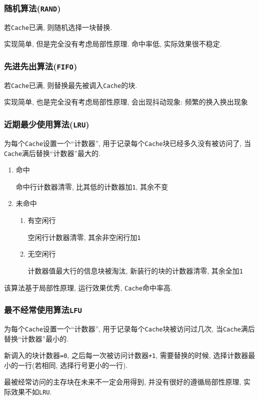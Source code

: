 \subsubsection{随机算法(\texttt{RAND})}
若\verb|Cache|已满, 则随机选择一块替换. \par
实现简单, 但是完全没有考虑局部性原理. 命中率低, 实际效果很不稳定.
\subsubsection{先进先出算法(\texttt{FIFO})}
若\verb|Cache|已满, 则替换最先被调入\verb|Cache|的块. \par
实现简单, 也是完全没有考虑局部性原理, 会出现抖动现象: 频繁的换入换出现象
\subsubsection{近期最少使用算法(\texttt{LRU})}
为每个\verb|Cache|设置一个``计数器'', 用于记录每个\verb|Cache|块已经多久没有被访问了, 当\verb|Cache|满后替换``计数器''最大的. \par
\begin{enumerate}
\item 命中 \par 命中行计数器清零, 比其低的计数器加\verb|1|, 其余不变
\item 未命中
\begin{enumerate}
\item 有空闲行 \par 空闲行计数器清零, 其余非空闲行加\verb|1|
\item 无空闲行 \par 计数器值最大行的信息块被淘汰, 新装行的块的计数器清零, 其余全加\verb|1|
\end{enumerate}
\end{enumerate}\par
该算法基于局部性原理, 运行效果优秀, \verb|Cache|命中率高.
\subsubsection{最不经常使用算法\texttt{LFU}}
为每个\verb|Cache|设置一个``计数器'', 用于记录每个\verb|Cache|块被访问过几次, 当\verb|Cache|满后替换``计数器''最小的. \par
新调入的块计数器\verb|=0|, 之后每一次被访问计数器\verb|+1|, 需要替换的时候, 选择计数器最小的一行(若相同, 选择行号更小的一行). \par
最被经常访问的主存块在未来不一定会用得到, 并没有很好的遵循局部性原理, 实际效果不如\verb|LRU|.
